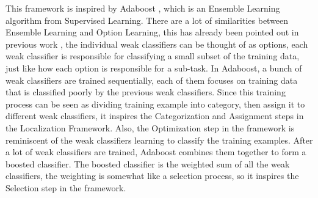 \documentclass{article}
\begin{document}
	\quad This framework is inspired by Adaboost \cite{adaboost}, which is an Ensemble Learning algorithm from Supervised Learning. There are a lot of similarities between Ensemble Learning and Option Learning, this has already been pointed out in previous work \cite{zhang2018ace}, the individual weak classifiers can be thought of as options, each weak classifier is responsible for classifying a small subset of the training data, just like how each option is responsible for a sub-task. In Adaboost, a bunch of weak classifiers are trained sequentially, each of them focuses on training data that is classified poorly by the previous weak classifiers. Since this training process can be seen as dividing training example into category, then assign it to different weak classifiers, it inspires the Categorization and Assignment steps in the Localization Framework. Also, the Optimization step in the framework is reminiscent of the weak classifiers learning to classify the training examples. After a lot of weak classifiers are trained, Adaboost combines them together to form a boosted classifier. The boosted classifier is the weighted sum of all the weak classifiers, the weighting is somewhat like a selection process, so it inspires the Selection step in the framework.
\end{document}
